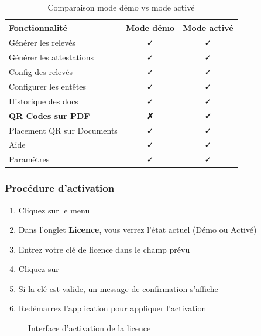 \begin{table}[h]
\centering
\begin{tabular}{|l|c|c|}
\hline
\textbf{Fonctionnalité} & \textbf{Mode démo} & \textbf{Mode activé} \\
\hline
Générer les relevés & ✓ & ✓ \\
Générer les attestations & ✓ & ✓ \\
Config des relevés & ✓ & ✓ \\
Configurer les entêtes & ✓ & ✓ \\
Historique des docs & ✓ & ✓ \\
\textbf{QR Codes sur PDF} & \textbf{✗} & \textbf{✓} \\
Placement QR sur Documents & ✓ & ✓ \\
Aide & ✓ & ✓ \\
Paramètres & ✓ & ✓ \\
\hline
\end{tabular}
\caption{Comparaison mode démo vs mode activé}
\end{table}


\subsubsection{Procédure d'activation}

\begin{enumerate}[leftmargin=*]
    \item Cliquez sur le menu 
    \item Dans l'onglet \textbf{Licence}, vous verrez l'état actuel (Démo ou Activé)
    \item Entrez votre clé de licence dans le champ prévu
    \item Cliquez sur 
    \item Si la clé est valide, un message de confirmation s'affiche
    \item Redémarrez l'application pour appliquer l'activation
\end{enumerate}

\begin{figure}[h]
    \centering
    \caption{Interface d'activation de la licence}
\end{figure}

